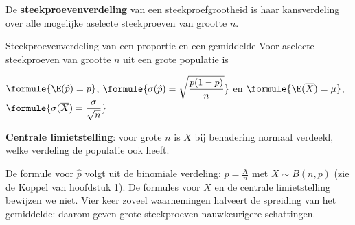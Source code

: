 \begin{theorie}
De \textbf{\textcolor{accent}{steekproevenverdeling}} van een steekproefgrootheid is haar kansverdeling over alle mogelijke aselecte steekproeven van grootte $n$.

\begin{stelling}{Steekproevenverdeling van een proportie en een gemiddelde}
Voor aselecte steekproeven van grootte $n$ uit een grote populatie is

\vspace{1mm}
\qquad $\formule{\E(\hat{p}) = p}$, \quad $\formule{\sigma(\hat{p}) = \sqrt{\dfrac{p(1 - p)}{n}}}$ \qquad en \qquad $\formule{\E(\overline{X}) = \mu}$, \quad $\formule{\sigma(\overline{X}) = \dfrac{\sigma}{\sqrt{n}}}$

\vspace{1mm}
\textbf{Centrale limietstelling}: voor grote $n$ is $\overline{X}$ bij benadering normaal verdeeld, welke verdeling de populatie ook heeft.
\end{stelling}
\end{theorie}

De formule voor $\hat{p}$ volgt uit de binomiale verdeling: $\hat{p} = \frac{X}{n}$ met $X \sim B(n, p)$ (zie de Koppel van hoofdstuk 1). De formules voor $\overline{X}$ en de centrale limietstelling bewijzen we niet. Vier keer zoveel waarnemingen halveert de spreiding van het gemiddelde: daarom geven grote steekproeven nauwkeurigere schattingen.


